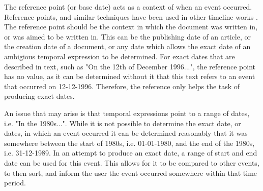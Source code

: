 \par The reference point (or base date) acts as a context of when an event occurred. Reference points, and similar techniques have been used in other timeline works \cite{mccloskymanning2012}. The reference point should be the context in which the document was written in, or was aimed to be written in. This can be the publishing date of an article, or the creation date of a document, or any date which allows the exact date of an ambigious temporal expression to be determined. For exact dates that are described in text, such as "On the 12th of December 1996...", the reference point has no value, as it can be determined without it that this text refers to an event that occurred on 12-12-1996. Therefore, the reference only helps the task of producing exact dates.

\par An issue that may arise is that temporal expressions point to a range of dates, i.e. "In the 1980s...". While it is not possible to determine the exact date, or dates, in which an event occurred it can be determined reasonably \cite{mccloskymanning2012} that it was somewhere between the start of 1980s, i.e. 01-01-1980, and the end of the 1980s, i.e. 31-12-1989. In an attempt to produce an exact date, a range of start and end date can be used for this event. This allows for it to be compared to other events, to then sort, and inform the user the event occurred somewhere within that time period. 


